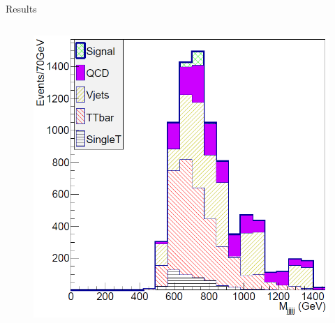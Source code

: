 \begin{frame}{Results}
\begin{columns}
\begin{column}{.50\textwidth}
\begin{figure}[!Hhtbp]
  \begin{center}
    \includegraphics[width=1.0\textwidth]{../figs/Pheno/Final.png}
  \end{center}
\end{figure}
\end{column}
\end{columns}

\end{frame}

%
%
%
%
